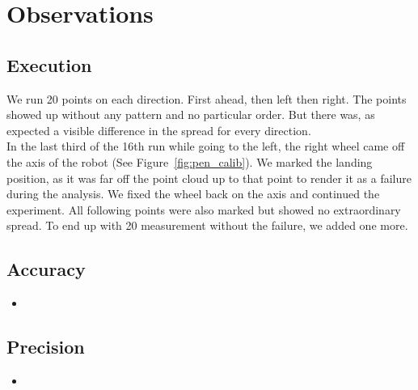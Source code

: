 \documentclass{scrartcl}
\begin{document}



\section{Observations}
\subsection{Execution}
We run 20 points on each direction. First ahead, then left then right. The points showed up without any pattern and no particular order. But there was, as expected a visible difference in the spread for every direction.\\
In the last third of the 16th run while going to the left, the right wheel came off the axis of the robot (See Figure~\ref{fig:pen_calib}).
We marked the landing position, as it was far off the point cloud up to that point to render it as a failure during the analysis. We fixed the wheel back on the axis and continued the experiment. All following points were also marked but showed no extraordinary spread. To end up with 20 measurement without the failure, we added one more.

\subsection{Accuracy}
\begin{itemize}
\item
\end{itemize}

\subsection{Precision}
\begin{itemize}
\item
\end{itemize}
\end{document}
